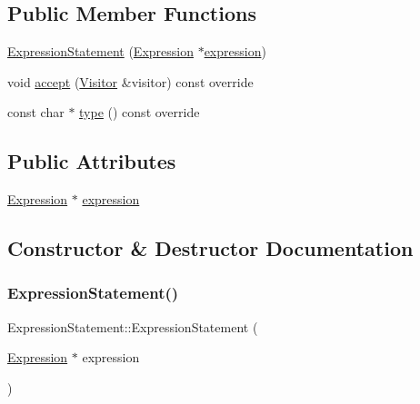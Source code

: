 \subsection*{Public Member Functions}
\begin{DoxyCompactItemize}
\item 
\hyperlink{struct_expression_statement_ad195f09357c26895bf7b8ac7e30ddde3}{Expression\+Statement} (\hyperlink{struct_expression}{Expression} $\ast$\hyperlink{struct_expression_statement_af8fa751297f7dd719ebe74d62201fc3a}{expression})
\item 
void \hyperlink{struct_expression_statement_a6463f779ec4140b2510d854726aefd40}{accept} (\hyperlink{struct_visitor}{Visitor} \&visitor) const override
\item 
const char $\ast$ \hyperlink{struct_expression_statement_a39b8f80f97a0a5f346c1e34f1ba6939c}{type} () const override
\end{DoxyCompactItemize}
\subsection*{Public Attributes}
\begin{DoxyCompactItemize}
\item 
\hyperlink{struct_expression}{Expression} $\ast$ \hyperlink{struct_expression_statement_af8fa751297f7dd719ebe74d62201fc3a}{expression}
\end{DoxyCompactItemize}


\subsection{Constructor \& Destructor Documentation}
\mbox{\label{struct_expression_statement_ad195f09357c26895bf7b8ac7e30ddde3}} 
\subsubsection{\texorpdfstring{Expression\+Statement()}{ExpressionStatement()}}
{\footnotesize\ttfamily Expression\+Statement\+::\+Expression\+Statement (\begin{DoxyParamCaption}\item[{\hyperlink{struct_expression}{Expression} $\ast$}]{expression }\end{DoxyParamCaption})\hspace{0.3cm}{\ttfamily [inline]}}



